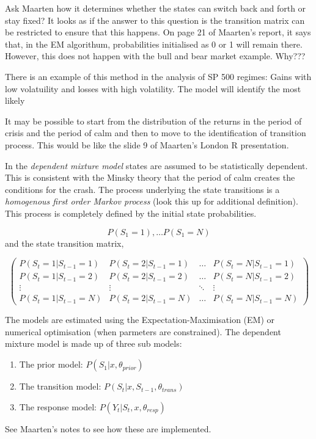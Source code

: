 \documentclass[12pt, a4paper, oneside]{article} %
\begin{document}
Ask Maarten how it determines whether the states can switch back and forth or stay fixed?  It looks as if the answer to this question is the transition matrix can be restricted to ensure that this happens.  On page 21 of Maarten's report, it says that, in the EM algorithum, probabilities initialised as 0 or 1 will remain there.  However, this does not happen with the bull and bear market example.  Why???

There is an example of this method in the analysis of SP 500 regimes: Gains with low volatuility and losses with high volatility. The model will identify the most likely 

It may be possible to start from the distribution of the returns in the period of crisis and the period of calm and then to move to the identification of transition process.  This would be like the slide 9 of Maarten's London R presentation. 

In the \emph{dependent mixture model} states are assumed to be statistically dependent.  This is consistent with the Minsky theory that the period of calm creates the conditions for the crash. The process underlying the state transitions is a \emph{homogenous first order Markov process}  (look this up for additional definition).  This process is completely defined by the initial state probabilities.  

\begin{equation*}
P(S_1 = 1), \dots P(S_1 = N)
\end{equation*}
and the state transition matrix, 

\begin{equation*}
\begin{pmatrix}
P(S_t = 1|S_{t-1}=1) & P(S_t = 2|S_{t-1}=1) & \dots & P(S_t = N|S_{t-1}=1)\\
P(S_t = 1|S_{t-1}=2) & P(S_t = 2|S_{t-1}=2) & \dots & P(S_t = N|S_{t-1}=2)\\
\vdots & \vdots & \ddots & \vdots \\
P(S_t = 1|S_{t-1}=N) & P(S_t = 2|S_{t-1}=N) & \dots & P(S_t = N|S_{t-1}=N)
\end{pmatrix}
\end{equation*}

The models are estimated using the Expectation-Maximisation (EM) or numerical optimisation (when parmeters are constrained).  The dependent mixture model is made up of three sub models:  
\begin{enumerate}
\item The prior model: $P(S_1|x, \theta_{prior})$
\item The transition model: $P(S_t|x, S_{t-1}, \theta_{trans})$
\item The response model: $P(Y_t| S_t, x, \theta_{resp})$
\end{enumerate}
 See Maarten's notes to see how these are implemented.  
 
\end{document}
